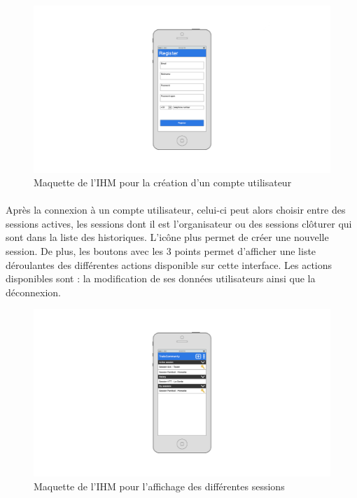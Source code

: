 \documentclass[titlepage, 12pt]{report}
\begin{document}
\begin{figure}[!h]
	\caption{Maquette de l'IHM pour la création d'un compte utilisateur}
	\label{create_user_account}
	\centering
	\includegraphics[scale=0.3]{images/mockups/register.png}
\end{figure}

\clearpage

\paragraph{}Après la connexion à un compte utilisateur, celui-ci peut alors choisir entre des sessions actives, les sessions dont il est l'organisateur ou des sessions clôturer qui sont dans la liste des historiques. L'icône plus permet de créer une nouvelle session. De plus, les boutons avec les 3 points permet d'afficher une liste déroulantes des différentes actions disponible sur cette interface. Les actions disponibles sont : la modification de ses données utilisateurs ainsi que la déconnexion.

\begin{figure}[!h]
	\caption{Maquette de l'IHM pour l'affichage des différentes sessions}
	\label{all_sessions}
	\centering
	\includegraphics[scale=0.3]{images/mockups/session_view.png}
\end{figure}
\end{document}
